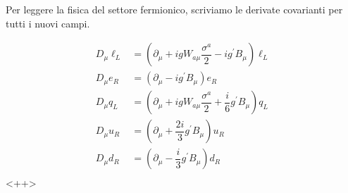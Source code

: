 \documentclass[italian,a4paper]{article}
\theoremstyle{definition}
\newcommand{\dimu}{\ensuremath{\partial_{\mu}}}
\newcommand{\Dimu}{\ensuremath{D_{\mu}}}
\begin{document}
Per leggere la fisica del settore fermionico, scriviamo le derivate
covarianti per tutti i nuovi campi.

\begin{align*}
    \Dimu \ell_L &= 
    (\dimu + i g W_{a\mu}\dfrac{\sigma^a}{2} - i g^{\prime} B_\mu) \ell_L\\
    \Dimu e_R &= (\dimu - i g^\prime B_\mu) e_R\\
    \Dimu q_L &= 
    (\dimu + i g W_{a\mu}\dfrac{\sigma^a}{2} + \dfrac{i}{6} g^{\prime}
    B_\mu) q_L\\
    \Dimu u_R &= (\dimu + \dfrac{2i}{3} g^\prime B_\mu) u_R\\
    \Dimu d_R &= (\dimu - \dfrac{i}{3} g^\prime B_\mu) d_R\\
\end{align*}<++>
\end{document}
